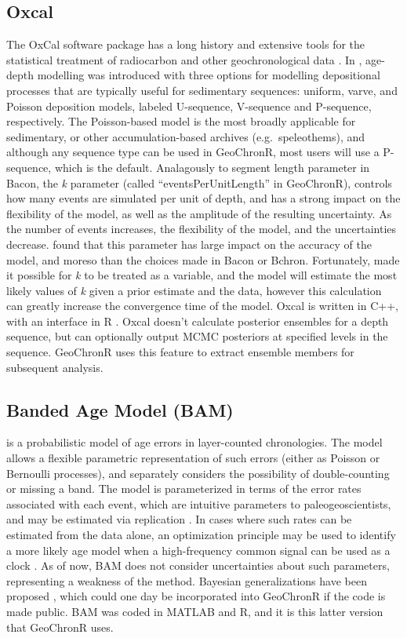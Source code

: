 \documentclass[gchron, manuscript]{copernicus}
\begin{document}
\subsection{Oxcal}

The OxCal software package has a long history and extensive tools for the statistical treatment of radiocarbon and other geochronological data \citep{BronkRamsey95}.
In \citet{ramsey2008deposition}, age-depth modelling was introduced with three options for modelling depositional processes that are typically useful for sedimentary sequences: uniform, varve, and Poisson deposition models, labeled U-sequence, V-sequence and P-sequence, respectively.
The Poisson-based model is the most broadly applicable for sedimentary, or other accumulation-based archives (e.g.~speleothems), and although any sequence type can be used in GeoChronR, most users will use a P-sequence, which is the default.
Analagously to segment length parameter in Bacon, the \emph{k} parameter (called ``eventsPerUnitLength'' in GeoChronR), controls how many events are simulated per unit of depth, and has a strong impact on the flexibility of the model, as well as the amplitude of the resulting uncertainty.
As the number of events increases, the flexibility of the model, and the uncertainties decrease.
\citet{trachsel2017} found that this parameter has large impact on the accuracy of the model, and moreso than the choices made in Bacon or Bchron.
Fortunately, \citet{bronkramsey2010} made it possible for \emph{k} to be treated as a variable, and the model will estimate the most likely values of \emph{k} given a prior estimate and the data, however this calculation can greatly increase the convergence time of the model.
Oxcal is written in C++, with an interface in R \citep{oxcAAR}.
Oxcal doesn't calculate posterior ensembles for a depth sequence, but can optionally output MCMC posteriors at specified levels in the sequence.
GeoChronR uses this feature to extract ensemble members for subsequent analysis.

\subsection{Banded Age Model (BAM)}

\citet{BAM} is a probabilistic model of age errors in layer-counted chronologies.
The model allows a flexible parametric representation of such errors (either as Poisson or Bernoulli processes), and separately considers the possibility of double-counting or missing a band.
The model is parameterized in terms of the error rates associated with each event, which are intuitive parameters to paleogeoscientists, and may be estimated via replication \citep{DeLong_Paleo3_2013}.
In cases where such rates can be estimated from the data alone, an optimization principle may be used to identify a more likely age model when a high-frequency common signal can be used as a clock \citep{BAM}.
As of now, BAM does not consider uncertainties about such parameters, representing a weakness of the method.
Bayesian generalizations have been proposed \citep{BoersCP2017}, which could one day be incorporated into GeoChronR if the code is made public.
BAM was coded in MATLAB and R, and it is this latter version that GeoChronR uses.
\end{document}
